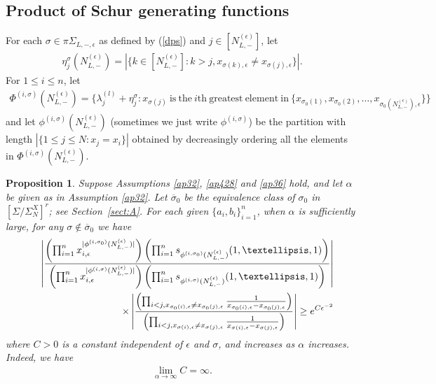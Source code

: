 \documentclass[11pt]{amsart}
\theoremstyle{plain}
\newtheorem{proposition}[theorem]{Proposition}
\theoremstyle{definition}
\theoremstyle{remark}
\newcommand\ol{\overline}
\newcommand\si{\sigma}
\numberwithin{equation}{section}
\numberwithin{theorem}{section}
\numberwithin{figure}{section}
\begin{document}
\subsection{Product of Schur generating functions}

For each $\sigma\in \pi\Sigma_{L,-,\epsilon}$ as defined by (\ref{dps}) and $j\in [N_{L,-}^{(\epsilon)}]$, let
\begin{eqnarray}
\eta_j^{\sigma}(N_{L,-}^{(\epsilon)})=|\{k\in [N_{L,-}^{(\epsilon)}]:k>j,x_{\sigma(k),\epsilon}\neq x_{\sigma(j),\epsilon}\}|.\label{et}
\end{eqnarray}
For $1\leq i\leq n$, let
\begin{align}
\Phi^{(i,\sigma)}(N_{L,-}^{(\epsilon)})=\{\lambda_j^{(l)}+\eta_j^{\sigma}:x_{\sigma(j)}\ \mathrm{is\ the\ }i\mathrm{th\ greatest\ element\ in}\ \{x_{\si_0(1)},x_{\si_0(2)},\ldots,x_{\si_0(N_{L,-}^{(\epsilon)}),\epsilon}\}\}
\label{pis}
\end{align}
and let $\phi^{(i,\sigma)}(N_{L,-}^{(\epsilon)})$ (sometimes we just write $\phi^{(i,\sigma)}$) be the partition with length $|\{1\leq j\leq N: x_j=x_i\}|$ obtained by decreasingly ordering all the elements in $\Phi^{(i,\sigma)}(N_{L,-}^{(\epsilon)})$.




\begin{proposition}\label{p436}Suppose Assumptions \ref{ap32}, \ref{ap428} and \ref{ap36} hold, and let $\alpha$ be given as in Assumption \ref{ap32}. Let 
$\ol{\si}_0$ be the equivalence class of $\si_0$ in $[\Sigma/\Sigma_N^X]^r$; see Section~\ref{sect:A}.
For each given $\{a_i,b_i\}_{i=1}^{n}$, when $\alpha$ is sufficiently large, for any $\sigma\notin \ol{\si}_0$ we have
\begin{eqnarray}
\label{gep}&&\left|\frac{\left(\prod_{i=1}^{n}x_{i,\epsilon}^{|\phi^{(i,\sigma_0)}(N_{L,-}^{(\epsilon)})|}\right)\left(\prod_{i=1}^{n}s_{\phi^{(i,\sigma_0)}(N_{L,-}^{(\epsilon)})}(1,\ldots,1)\right)}{\left(\prod_{i=1}^{n}x_{i,\epsilon}^{|\phi^{(i,\sigma)}(N_{L,-}^{(\epsilon)})|}\right)\left(\prod_{i=1}^{n}s_{\phi^{(i,\sigma)}(N_{L,-}^{(\epsilon)})}(1,\ldots,1)\right)
}\right|\\
&&\times\left|\frac{\left(\prod_{i<j,x_{\sigma_0(i),\epsilon}\neq x_{\sigma_0(j),\epsilon}}\frac{1}{x_{\sigma_0(i),\epsilon}-x_{\sigma_0(j),\epsilon}}\right)}{\left(\prod_{i<j,x_{\sigma(i),\epsilon}\neq x_{\sigma(j),\epsilon}}\frac{1}{x_{\sigma(i),\epsilon}-x_{\sigma(j),\epsilon}}\right)}\right|\notag\geq e^{C\epsilon^{-2}}\notag
\end{eqnarray}
where $C>0$ is a constant independent of $\epsilon$ and $\si$, and increases as $\alpha$ increases. Indeed, we have
\begin{eqnarray*}
\lim_{\alpha\rightarrow\infty} C=\infty.
\end{eqnarray*}
\end{proposition}
\end{document}
